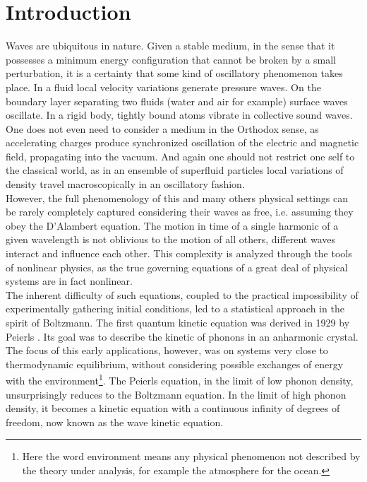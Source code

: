 

\newpage
\vphantom{}
\section*{Introduction}
    Waves are ubiquitous in nature. Given a stable medium, in the sense that it possesses a minimum energy configuration that cannot be broken by a small perturbation, it is a certainty that some kind of oscillatory phenomenon takes place. In a fluid local velocity variations generate pressure waves. On the boundary layer separating two fluids (water and air for example) surface waves oscillate. In a rigid body, tightly bound atoms vibrate in collective sound waves. One does not even need to consider a medium in the Orthodox sense, as accelerating charges produce synchronized oscillation of the electric and magnetic field, propagating into the vacuum. And again one should not restrict one self to the classical world, as in an ensemble of superfluid particles local variations of density travel macroscopically in an oscillatory fashion. \\
    However, the full phenomenology of this and many others physical settings can be rarely completely captured considering their waves as free, i.e. assuming they obey the D'Alambert equation. The motion in time of a single harmonic of a given wavelength is not oblivious to the motion of all others, different waves interact and influence each other. This complexity is analyzed through the tools of nonlinear physics, as the true governing equations of a great deal of physical systems are in fact nonlinear.\\
    The inherent difficulty of such equations, coupled to the practical impossibility of experimentally gathering initial conditions, led to a statistical approach in the spirit of Boltzmann. The first quantum kinetic equation was derived in 1929 by Peierls \cite{Peierls1929}. Its goal was to describe the kinetic of phonons in an anharmonic crystal. The focus of this early applications, however, was on systems very close to thermodynamic equilibrium, without considering possible exchanges of energy with the environment\footnote{Here the word environment means any physical phenomenon not described by the theory under analysis, for example the atmosphere for the ocean.}. The Peierls equation, in the limit of low phonon density, unsurprisingly reduces to the Boltzmann equation. In the limit of high phonon density, it becomes a kinetic equation with a continuous infinity of degrees of freedom, now known as the wave kinetic equation.\\
